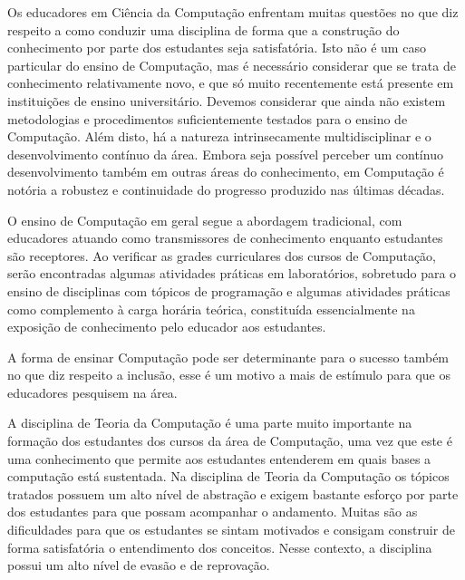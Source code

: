 \newcommand{\publicacaoTemplate}[2]{%
\textbf{#1} : #2}


\acresetall
\label{cap-introducao}
Os educadores em Ciência da Computação enfrentam muitas questões no que diz
respeito a como conduzir uma disciplina de forma que a construção do conhecimento
por parte dos estudantes seja satisfatória.
Isto não é um caso particular do ensino de Computação,
mas é necessário considerar que se trata de
conhecimento relativamente novo, e que só muito
recentemente está presente em instituições de ensino universitário.
Devemos considerar que ainda não existem metodologias e procedimentos
suficientemente testados para o ensino de Computação.
Além disto, há a natureza intrinsecamente multidisciplinar e
o desenvolvimento contínuo da área.
Embora seja possível perceber um contínuo desenvolvimento também em
outras áreas do conhecimento, em Computação é notória a robustez e
continuidade do progresso produzido nas últimas décadas.

O ensino de Computação em geral segue a abordagem tradicional,
com educadores atuando como transmissores de conhecimento
enquanto estudantes são receptores.
Ao verificar as grades curriculares dos cursos de Computação,
serão encontradas algumas atividades práticas em laboratórios,
sobretudo para o ensino de disciplinas com tópicos de programação e
algumas atividades práticas como complemento à carga horária teórica,
constituída essencialmente na exposição de conhecimento pelo educador
aos estudantes.

A forma de ensinar Computação pode ser determinante
para o sucesso também no que diz respeito a
inclusão, esse é um motivo a mais de estímulo para
que os educadores pesquisem na área.

A disciplina de Teoria da Computação é uma parte muito importante
na formação dos estudantes dos cursos da área de Computação, uma 
vez que este é uma conhecimento que permite aos estudantes
entenderem em quais bases a computação está sustentada.
Na disciplina de Teoria da Computação os tópicos tratados
possuem um alto nível de abstração e exigem bastante esforço
por parte dos estudantes para que possam acompanhar o
andamento.
Muitas são as dificuldades para que os estudantes se sintam
motivados e consigam construir de forma satisfatória o entendimento
dos conceitos.
Nesse contexto, a disciplina possui um alto nível de evasão e
de reprovação.

